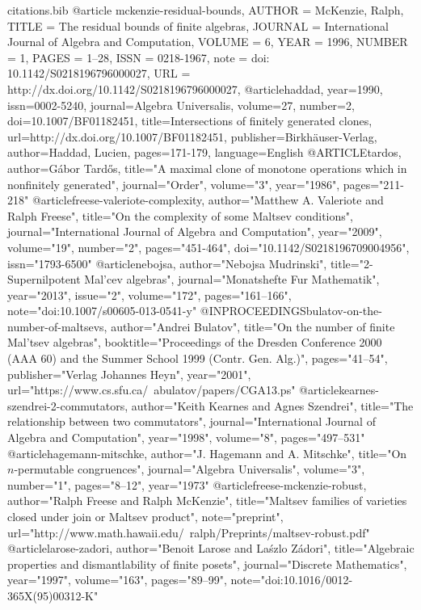 \begin{filecontents*}{citations.bib}
@article {mckenzie-residual-bounds,
     AUTHOR = {McKenzie, Ralph},
     TITLE = {The residual bounds of finite algebras},
     JOURNAL = {International Journal of Algebra and Computation},
    VOLUME = {6},
   YEAR = {1996},
   NUMBER = {1},
   PAGES = {1--28},
   ISSN = {0218-1967},
   note =  {doi: 10.1142/S0218196796000027},
   URL =  {http://dx.doi.org/10.1142/S0218196796000027},
}
@article{haddad,
  year={1990},
  issn={0002-5240},
  journal={Algebra Universalis},
  volume={27},
  number={2},
  doi={10.1007/BF01182451},
  title={Intersections of finitely generated clones},
  url={http://dx.doi.org/10.1007/BF01182451},
  publisher={Birkhäuser-Verlag},
  author={Haddad, Lucien},
  pages={171-179},
  language={English}
}
@ARTICLE{tardos,
   author={G\'abor Tard\H{o}s},
  title="A maximal clone of monotone operations which in nonfinitely
    generated",
  journal="Order",
  volume="3",
  year="1986",
  pages="211-218"
}
@article{freese-valeriote-complexity,
  author="Matthew A. Valeriote and Ralph Freese",
  title="On the complexity of some {M}altsev conditions",
  journal="International Journal of Algebra and Computation",
  year="2009",
  volume="19",
  number="2",
  pages="451-464",
  doi="10.1142/S0218196709004956",
  issn="1793-6500"
}
@article{nebojsa,
  author="Nebojsa Mudrinski",
  title="2-Supernilpotent {M}al'cev algebras",
  journal="Monatshefte Fur  Mathematik",
  year="2013",
    issue="2",
    volume="172",
    pages="161--166",
   note="doi:10.1007/s00605-013-0541-y"
}
@INPROCEEDINGS{bulatov-on-the-number-of-maltsevs,
  author="Andrei Bulatov",
  title="On the number of finite {M}al'tsev algebras",
  booktitle="Proceedings of the Dresden Conference 2000 (AAA 60) and the Summer School
    1999 (Contr. Gen. Alg.)",
  pages="41–54",
  publisher="Verlag Johannes Heyn", 
  year="2001",
  url="https://www.cs.sfu.ca/~abulatov/papers/CGA13.ps"
}
@article{kearnes-szendrei-2-commutators,
  author="Keith Kearnes and Agnes Szendrei",
  title="The relationship between two commutators",
  journal="International Journal of Algebra and Computation",
  year="1998",
  volume="8",
  pages="497--531"
}
@article{hagemann-mitschke,
  author="J. Hagemann and A.  Mitschke",
  title="On $n$-permutable congruences",
  journal="Algebra Universalis",
  volume="3",
  number="1",
  pages="8--12",
  year="1973"
}
@article{freese-mckenzie-robust,
  author="Ralph Freese and Ralph McKenzie",
  title="Maltsev families of varieties closed under
   join or {M}altsev product",
  note="preprint",
 url="http://www.math.hawaii.edu/~ralph/Preprints/maltsev-robust.pdf"
}
@article{larose-zadori,
  author="Benoit Larose and La\'szlo Z\'adori",
  title="Algebraic properties and dismantlability of finite posets",
  journal="Discrete Mathematics",
  year="1997",
  volume="163",
  pages="89--99",
  note="doi:10.1016/0012-365X(95)00312-K"
}
\end{filecontents*}

